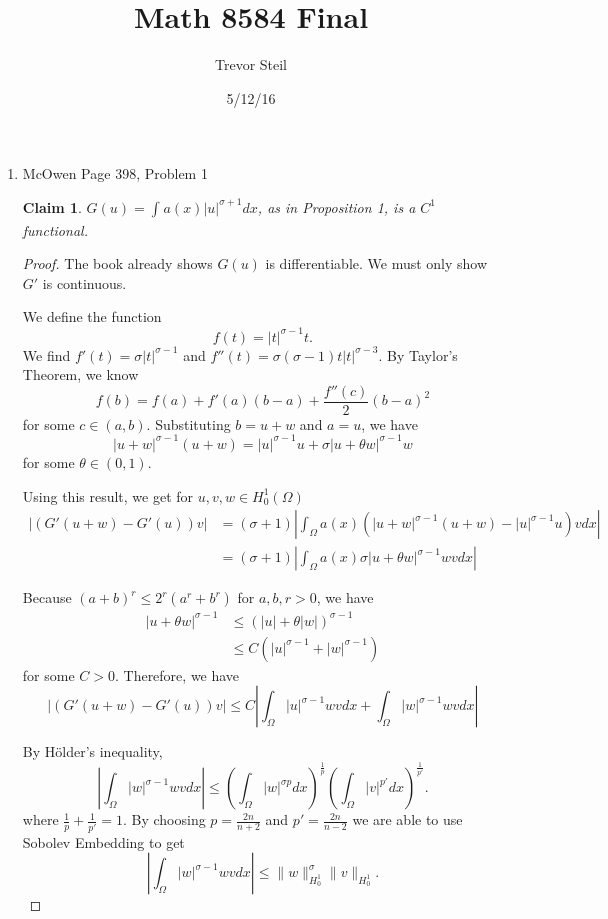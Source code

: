 \documentclass[a4paper]{article}
\title{Math 8584 Final }
\date{5/12/16}
\author{Trevor Steil}
\newtheorem*{claim}{Claim}
\begin{document}
\maketitle

\begin{enumerate}
  \item McOwen Page 398, Problem 1
    \begin{claim} $G(u) = \int_{}^{} a(x) |u|^{\sigma + 1} dx$, as in Proposition 1, is a $C^1$ functional.
    \end{claim}

    \begin{proof}
      The book already shows $G(u)$ is differentiable. We must only show $G'$ is continuous.

      We define the function
      \[ f(t) = |t|^{\sigma-1}t .\]
      We find $f'(t) = \sigma |t|^{\sigma-1}$ and $f''(t) = \sigma (\sigma -1) t |t|^{\sigma-3}$. By Taylor's Theorem, we know
      \[ f(b) = f(a) + f'(a)(b-a) + \frac{f''(c)}{2} (b-a)^2 \]
      for some $c \in (a,b)$. Substituting $b = u+w$ and $a = u$, we have
      \[ |u+w|^{\sigma-1} (u+w) = |u|^{\sigma-1} u + \sigma |u+\theta w|^{\sigma-1}w \]
    for some $\theta \in (0,1)$.

    Using this result, we get for $u,v,w \in H^1_0(\Omega)$
    \begin{align*}
      |(G'(u+w) - G'(u))v| &= (\sigma+1) \left| \int_{\Omega}^{} a(x) \left( |u+w|^{\sigma-1}(u+w) - |u|^{\sigma-1}u \right) v dx \right| \\
      &= (\sigma + 1) \left| \int_{\Omega}^{} a(x) \sigma |u + \theta w|^{\sigma-1} w v dx \right|
    \end{align*}

    Because $(a+b)^r \leq 2^r(a^r + b^r)$ for $a,b,r>0$, we have
    \begin{align*}
      |u+\theta w|^{\sigma-1} &\leq ( |u| + \theta |w| )^{\sigma-1} \\
      &\leq C ( |u|^{\sigma-1} + |w|^{\sigma-1} )
    \end{align*}
    for some $C>0$. Therefore, we have
    \begin{equation*}
      |(G'(u+w) - G'(u))v| \leq C \left| \int_{\Omega}^{} |u|^{\sigma-1} w v dx + \int_{\Omega}^{} |w|^{\sigma-1}w v dx \right|
    \end{equation*}

    By H\"{o}lder's inequality,
    \[ \left|\int_{\Omega}^{} |w|^{\sigma-1} w v dx \right| \leq \left( \int_{\Omega}^{} |w|^{\sigma p} dx \right)^{\frac{1}{p}} \left( \int_{\Omega}^{} |v|^{p'} dx
    \right)^{\frac{1}{p'}} .\]
    where $\frac{1}{p} + \frac{1}{p'} = 1$. By choosing $p=\frac{2n}{n+2}$ and $p'=\frac{2n}{n-2}$ we are able to use Sobolev Embedding to get
    \[ \left| \int_{\Omega}^{} |w|^{\sigma-1} w v dx \right| \leq \|w\|_{H^1_0}^\sigma \|v\|_{H^1_0} .\]


\end{proof}
\end{enumerate}
\end{document}
